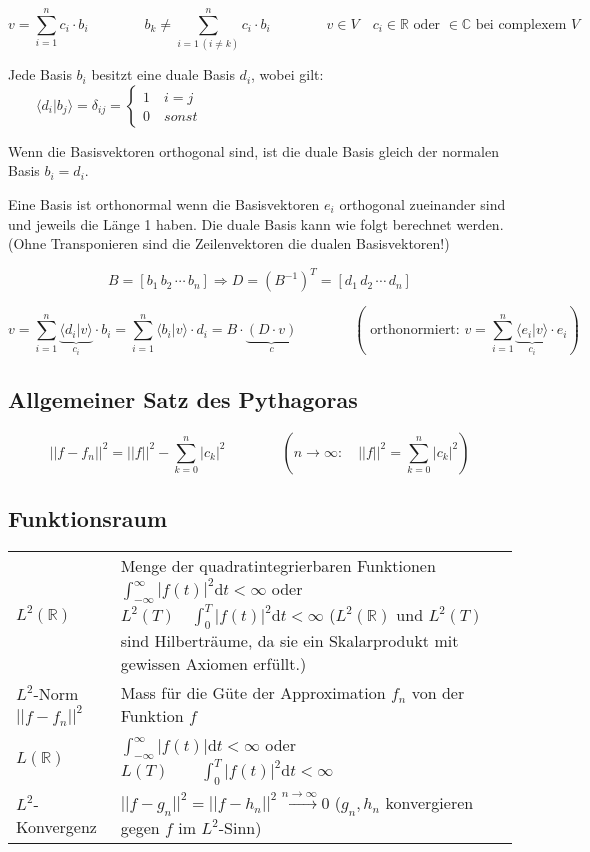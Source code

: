 \[  
	v = \sum_{i=1}^{n}c_i \cdot b_i \qquad \qquad  b_k \neq \sum_{i=1 \, (i\neq k)}^{n}c_i \cdot b_i \qquad \qquad v \in V \quad c_i \in \mathbb{R}\text{ oder } \in \mathbb{C} \text{ bei complexem $V$}
\]

Jede Basis $b_i$ besitzt eine duale Basis $d_i$, wobei gilt: $\qquad \langle d_i|b_j\rangle = \delta_{ij} = \begin{cases} 1 \quad i=j\\ 0 \quad sonst  \end{cases}$

Wenn die Basisvektoren orthogonal sind, ist die duale Basis gleich der normalen Basis $b_i = d_i$.

Eine Basis ist orthonormal wenn die Basisvektoren $e_i$ orthogonal zueinander sind und jeweils die Länge 1 haben. Die duale Basis kann wie folgt berechnet werden. (Ohne Transponieren sind die Zeilenvektoren die dualen Basisvektoren!)

\[  
	B = \left[ b_1 \, b_2 \, \cdots \, b_n \right] \Rightarrow D=(B^{-1})^T = \left[ d_1 \, d_2 \, \cdots \, d_n \right]
\]

\[
	v=\sum_{i=1}^{n} \underbrace{\langle d_i|v \rangle}_{c_i} \cdot b_i = \sum_{i=1}^{n} \langle b_i|v \rangle \cdot d_i = B \cdot \underbrace{(D \cdot v)}_{c}
	\qquad \qquad 
	\left( \text{ orthonormiert: } v=\sum_{i=1}^{n} \underbrace{\langle e_i|v \rangle}_{c_i} \cdot e_i \right) 
\]


\subsection{Allgemeiner Satz des Pythagoras}

\[  
	||f-f_n||^2 =  ||f||^2 - \sum_{k=0}^{n} |c_k|^2 \qquad \qquad \left( n\rightarrow \infty: \quad ||f||^2=\sum_{k=0}^{n} |c_k|^2 \right)
\]


\subsection{Funktionsraum}
\begin{tabularx}{\textwidth}{p{4cm} X}
  $L^2(\mathbb{R})$ 
    &Menge der quadratintegrierbaren Funktionen $\int_{-\infty}^{\infty}|f(t)|^2 \mathrm{d}t < \infty$ oder $L^2(T) \quad \int_{0}^{T}|f(t)|^2 \mathrm{d}t < \infty$\newline
  ($L^2(\mathbb{R})$ und $L^2(T)$ 
    sind Hilberträume, da sie ein Skalarprodukt mit gewissen Axiomen erfüllt.) \\
  $L^2$-Norm $||f-f_n||^2$ 
    & Mass für die Güte der Approximation $f_n$ von der Funktion $f$\\
  $L(\mathbb{R})$ & $\int_{-\infty}^{\infty}|f(t)| \mathrm{d}t < \infty$ oder $L(T) \qquad \int_{0}^{T}|f(t)|^2 \mathrm{d}t < \infty$\\
  $L^2$-Konvergenz
    & $||f-g_n||^2 = ||f-h_n||^2 \xrightarrow{n \rightarrow \infty} 0$ ($g_n, h_n$ konvergieren gegen $f$ im $L^2$-Sinn)
\end{tabularx}




